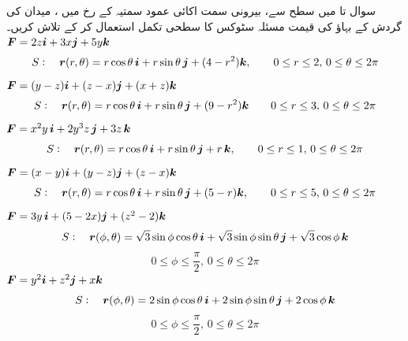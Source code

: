 سوال  تا    میں   سطح  سے، بیرونی سمت    اکائی عمود سمتیہ  کے رخ میں ،   میدان   کی گردش کے بہاؤ کی قیمت  مسئلہ سٹوکس کا سطحی تکمل استعمال کر کے تلاش کریں۔
\(\kvec{F}=2z\ai+3x\aj+5y\ak\)\\
\[
S:\quad \kvec{r}(r,\theta)=r\cos \theta\,\ai+r\sin \theta\,\aj+(4-r^2)\ak,\qquad
0\le r\le2,\,0\le \theta \le 2\pi
\]
\wf{\unexpanded{$12\pi$}}
\(\kvec{F}=(y-z)\ai+(z-x)\aj+(x+z)\ak\)\\
\[
 S:\quad  \kvec{r}(r,\theta) = r\cos \theta\,\ai + r\sin \theta\,\aj + (9-r^2)\ak\qquad
 0\le r\le3, \, 0\le \theta \le 2\pi
\]
  \( \kvec{F} = x^2y\,\ai + 2y^3z\,\aj + 3z\,\ak \)
\[S:\quad  \kvec{r}(r,\theta) = r\cos \theta\,\ai + r\sin \theta\,\aj + r\,\ak,\qquad 0\le r\le1, \, 0\le \theta\le2\pi \]
  \( \kvec{F} = (x-y)\ai + (y-z)\aj + (z-x)\ak \)
\[ S:\quad \kvec{r}(r,\theta) = r\cos \theta\,\ai + r\sin \theta\,\aj + (5-r)\ak,\qquad 0\le r\le5, \, 0\le \theta\le2\pi \]
  \( \kvec{F} = 3y\,\ai + (5-2x)\aj + (z^2-2)\ak \)
\[S:\quad  \kvec{r}(\phi,\theta) = \sqrt{3}\sin\phi\cos \theta\,\ai + \sqrt{3}\sin\phi\sin \theta\,\aj + \sqrt{3}\cos\phi\,\ak\]
\[ 0\le\phi\le\frac{\pi}{2}, \, 0\le \theta\le2\pi \]
\wf{\unexpanded{$-15\pi$}}
  \( \kvec{F} = y^2\ai + z^2\aj + x\ak \)
  \[S:\quad \kvec{r}(\phi,\theta) = 2\sin\phi\cos \theta\,\ai + 2\sin\phi\sin \theta\,\aj + 2\cos\phi\,\ak\]
\[0\le\phi\le\frac{\pi}{2}, \, 0\le \theta\le2\pi \]

